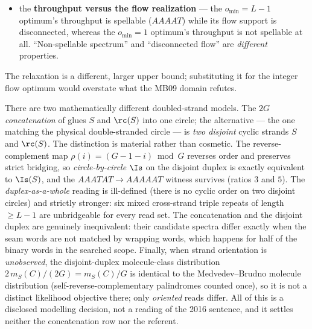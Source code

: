 \begin{remark}
\begin{itemize}
        $o_{\min}=L-1$ witnesses live on different graphs (the shorter overlaps
        exist only when $o_{\min}\le L-2$), so neither may be read as the other;
        the spelled witnesses (Thm.~\ref{thm:cex-molecule} and the rows
        below it) are stated at $o_{\min}=L-1=2$;
  \item the \textbf{throughput versus the flow realization} --- the
        $o_{\min}=L-1$ optimum's throughput is spellable ($AAAAT$) while its
        flow support is disconnected, whereas the $o_{\min}=1$ optimum's
        throughput is not spellable at all. ``Non-spellable spectrum'' and
        ``disconnected flow'' are \emph{different} properties.
\end{itemize}
The relaxation is a different, larger upper bound; substituting it for the
integer flow optimum would overstate what the MB09 domain refutes.
\end{remark}

\begin{remark}
\label{rem:duplex}
There are two mathematically different doubled-strand models. The
$2G$ \emph{concatenation} of \parencite{bresler2013} glues $S$ and $\rc(S)$ into one
circle; the alternative --- the one matching the physical double-stranded
circle --- is \emph{two disjoint} cyclic strands $S$ and $\rc(S)$. The
distinction is material rather than cosmetic. The reverse-complement map
$\rho(i)=(G-1-i)\bmod G$ reverses order and preserves strict bridging, so
\emph{circle-by-circle} $\Is$ on the disjoint duplex is exactly equivalent to
$\Is(S)$, and the $AAATAT\to AAAAAT$ witness survives (ratios $3$ and $5$). The
\emph{duplex-as-a-whole} reading is ill-defined (there is no cyclic order on two
disjoint circles) and strictly stronger: six mixed cross-strand triple repeats
of length $\ge L-1$ are unbridgeable for every read set. The concatenation and
the disjoint duplex are genuinely inequivalent: their candidate spectra differ
exactly when the seam words are not matched by wrapping words, which happens for
half of the binary words in the searched scope. Finally, when strand orientation
is \emph{unobserved}, the disjoint-duplex molecule-class distribution
$2\,m_S(C)/(2G)=m_S(C)/G$ is identical to the Medvedev--Brudno molecule
distribution (self-reverse-complementary palindromes counted once), so it is not
a distinct likelihood objective there; only \emph{oriented} reads differ. All of
this is a disclosed modelling decision, not a reading of the 2016 sentence, and
it settles neither the concatenation row nor the referent.
\end{remark}
